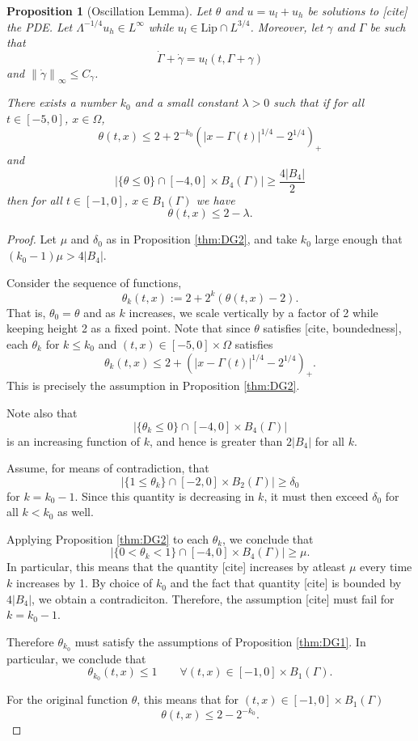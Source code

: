 \documentclass[11pt]{amsart}
\newtheorem{proposition}[theorem]{Proposition}
\theoremstyle{remark}
\theoremstyle{definition}
\newcommand{\norm}[1]{\left\lVert#1\right\rVert}
\newcommand{\paren}[1]{\left( #1 \right)}
\newcommand{\abs}[1]{\left\lvert #1 \right\rvert}
\newcommand{\Lip}{\text{Lip}}
\newcommand{\ulow}{u_l}
\newcommand{\uhigh}{u_h}
\begin{document}
\begin{proposition}[Oscillation Lemma] \label{thm:oscillation general}
Let $\theta$ and $u = \ulow + \uhigh$ be solutions to [cite] the PDE.  Let $\Lambda^{-1/4} \uhigh \in L^\infty$ while $\ulow \in \Lip \cap L^{3/4}$.  Moreover, let $\gamma$ and $\Gamma$ be such that
\[ \dot{\Gamma} + \dot{\gamma} = \ulow(t,\Gamma+\gamma) \]
and $\norm{\dot{\gamma}}_\infty \leq C_\gamma$. 

There exists a number $k_0$ and a small constant $\lambda>0$ such that if for all $t \in [-5,0]$, $x \in \Omega$,
\[ \theta(t,x) \leq 2 + 2^{-k_0} \paren{|x-\Gamma(t)|^{1/4}-2^{1/4}}_+ \]
and
\[ \abs{\{\theta \leq 0\} \cap [-4,0]\times B_4(\Gamma)} \geq \frac{4|B_4|}{2} \]
then for all $t \in [-1,0]$, $x \in B_1(\Gamma)$ we have
\[ \theta(t,x) \leq 2 - \lambda. \]
\end{proposition}

\begin{proof}
Let $\mu$ and $\delta_0$ as in Proposition \ref{thm:DG2}, and take $k_0$ large enough that $(k_0-1) \mu > 4 |B_4|$.  

Consider the sequence of functions,
\[ \theta_k(t,x) := 2 + 2^k (\theta(t,x) - 2). \]
That is, $\theta_0 = \theta$ and as $k$ increases, we scale vertically by a factor of 2 while keeping height 2 as a fixed point.  Note that since $\theta$ satisfies [cite, boundedness], each $\theta_k$ for $k \leq k_0$ and $(t,x) \in [-5,0] \times \Omega$ satisfies
\[ \theta_k(t,x) \leq 2 + \paren{|x-\Gamma(t)|^{1/4}-2^{1/4}}_+. \]
This is precisely the assumption in Proposition \ref{thm:DG2}.  

Note also that
\[ \abs{\{\theta_k \leq 0\} \cap [-4,0]\times B_4(\Gamma)} \]
is an increasing function of $k$, and hence is greater than $2|B_4|$ for all $k$.  

Assume, for means of contradiction, that
\[ \abs{\{1 \leq \theta_k \} \cap [-2,0]\times B_2(\Gamma)} \geq \delta_0 \]
for $k = k_0-1$.  Since this quantity is decreasing in $k$, it must then exceed $\delta_0$ for all $ k < k_0$ as well.  

Applying Proposition \ref{thm:DG2} to each $\theta_k$, we conclude that 
\[ \abs{\{0 < \theta_k < 1\} \cap [-4,0]\times B_4(\Gamma)} \geq \mu. \]
In particular, this means that the quantity [cite] increases by atleast $\mu$ every time $k$ increases by 1. By choice of $k_0$ and the fact that quantity [cite] is bounded by $4|B_4|$, we obtain a contradiciton.  Therefore, the assumption [cite] must fail for $k = k_0-1$.  

Therefore $\theta_{k_0}$ must satisfy the assumptions of Proposition \ref{thm:DG1}.  In particular, we conclude that
\[ \theta_{k_0}(t,x) \leq 1 \qquad \forall (t,x) \in [-1,0]\times B_1(\Gamma). \]

For the original function $\theta$, this means that for $(t,x) \in [-1,0] \times B_1(\Gamma)$
\[ \theta(t,x) \leq 2 - 2^{-k_0}. \]
\end{proof}
\end{document}
